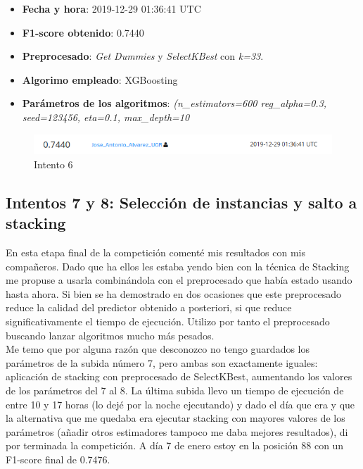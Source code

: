 \documentclass[11pt,a4paper]{article}
\begin{document}
	\begin{itemize}
		\item \textbf{Fecha y hora}: 2019-12-29 01:36:41 UTC
		\item \textbf{F1-score obtenido}: 0.7440
		\item \textbf{Preprocesado}: \emph{Get Dummies} y \emph{SelectKBest} con \emph{k=33}.
		\item \textbf{Algorimo empleado}: XGBoosting
		\item \textbf{Parámetros de los algoritmos}: \emph{(n\_estimators=600 reg\_alpha=0.3, seed=123456, eta=0.1, max\_depth=10}
	\end{itemize}
	
	\begin{figure}[H] 
		\centering
		\includegraphics[scale=0.6]{../capturas/T6}
		\caption{Intento 6}
	\end{figure}
	
	\subsection{Intentos 7 y 8: Selección de instancias y salto a stacking}
		
	En esta etapa final de la competición comenté mis resultados con mis compañeros. Dado que ha ellos les estaba yendo bien con la técnica de Stacking me propuse a usarla combinándola con el preprocesado que había estado usando hasta ahora. Si bien se ha demostrado en dos ocasiones que este preprocesado reduce la calidad del predictor obtenido a posteriori, si que reduce significativamente el tiempo de ejecución. Utilizo por tanto el preprocesado buscando lanzar algoritmos mucho más pesados. \\
	
	Me temo que por alguna razón que desconozco no tengo guardados los parámetros de la subida número 7, pero ambas son exactamente iguales: aplicación de stacking con preprocesado de SelectKBest, aumentando los valores de los parámetros del 7 al 8. La última subida llevo un tiempo de ejecución de entre 10 y 17 horas (lo dejé por la noche ejecutando) y dado el día que era y que la alternativa que me quedaba era ejecutar stacking con mayores valores de los parámetros (añadir otros estimadores tampoco me daba mejores resultados), di por terminada la competición. A día 7 de enero estoy en la posición 88 con un F1-score final de 0.7476.
	
\end{document}
